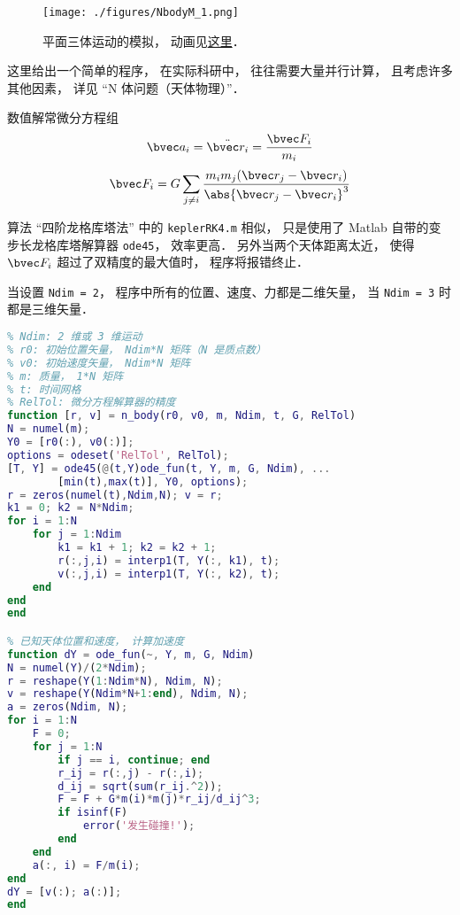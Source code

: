 
\begin{issues}
\issueDraft
\end{issues}


\begin{figure}[ht]
\centering
\texttt{[image: ./figures/NbodyM\_1.png]}
\caption{平面三体运动的模拟， 动画见\href{https://wuli.wiki/apps/3body.html}{这里}．} \label{NbodyM_fig1}
\end{figure}


这里给出一个简单的程序， 在实际科研中， 往往需要大量并行计算， 且考虑许多其他因素， 详见 “N 体问题（天体物理）”．

数值解常微分方程组
\begin{equation}
\bvec a_i = \ddot{\bvec r_i} = \frac{\bvec F_i}{m_i}
\end{equation}
\begin{equation}
\bvec F_i = G\sum_{j\ne i} \frac{m_i m_j(\bvec r_j - \bvec r_i)}{\abs{\bvec r_j - \bvec r_i}^3}
\end{equation}

算法 “四阶龙格库塔法” 中的 \verb|keplerRK4.m| 相似， 只是使用了 Matlab 自带的变步长龙格库塔解算器 \verb|ode45|， 效率更高． 另外当两个天体距离太近， 使得 $\bvec F_i$ 超过了双精度的最大值时， 程序将报错终止．

当设置 \verb|Ndim = 2|， 程序中所有的位置、速度、力都是二维矢量， 当 \verb|Ndim = 3| 时都是三维矢量．


\begin{lstlisting}[language=matlab, caption=n\_body.m]
% N 体问题（支持二维或三维）
% Ndim: 2 维或 3 维运动
% r0: 初始位置矢量， Ndim*N 矩阵（N 是质点数）
% v0: 初始速度矢量， Ndim*N 矩阵
% m: 质量， 1*N 矩阵
% t: 时间网格
% RelTol: 微分方程解算器的精度
function [r, v] = n_body(r0, v0, m, Ndim, t, G, RelTol)
N = numel(m);
Y0 = [r0(:), v0(:)];
options = odeset('RelTol', RelTol);
[T, Y] = ode45(@(t,Y)ode_fun(t, Y, m, G, Ndim), ...
        [min(t),max(t)], Y0, options);
r = zeros(numel(t),Ndim,N); v = r;
k1 = 0; k2 = N*Ndim;
for i = 1:N
    for j = 1:Ndim
        k1 = k1 + 1; k2 = k2 + 1;
        r(:,j,i) = interp1(T, Y(:, k1), t);
        v(:,j,i) = interp1(T, Y(:, k2), t);
    end
end
end

% 已知天体位置和速度， 计算加速度
function dY = ode_fun(~, Y, m, G, Ndim)
N = numel(Y)/(2*Ndim);
r = reshape(Y(1:Ndim*N), Ndim, N);
v = reshape(Y(Ndim*N+1:end), Ndim, N);
a = zeros(Ndim, N);
for i = 1:N
    F = 0;
    for j = 1:N
        if j == i, continue; end
        r_ij = r(:,j) - r(:,i);
        d_ij = sqrt(sum(r_ij.^2));
        F = F + G*m(i)*m(j)*r_ij/d_ij^3;
        if isinf(F)
            error('发生碰撞!');
        end
    end
    a(:, i) = F/m(i);
end
dY = [v(:); a(:)];
end
\end{lstlisting}

